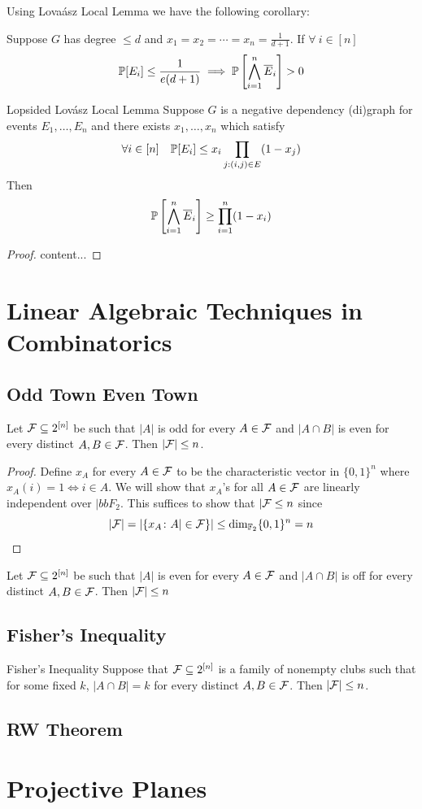 Using Lova\'{a}sz Local Lemma we have the following corollary:
\begin{corolary}{}{}
	Suppose $G$ has degree $\leq d$ and $x_1=x_2=\cdots=x_n=\frac1{d+1}$. If $\forall\ i\in[n]$ $$\mathbb{P}[E_i]\leq\frac{1}{e(d+1)}\implies \mathbb{P}\left[\bigwedge_{i=1}^n\overline{E}_i\right]>0$$
\end{corolary}
\begin{Theorem}{Lopsided Lov\'{a}sz Local Lemma}{}
	Suppose $G$ is a negative dependency (di)graph for events $E_1,\dots, E_n$ and there exists $x_1,\dots, x_n$ which satisfy $$\forall i\in[n]\quad \mathbb{P}[E_i]\leq x_i\prod_{j:(i,j)\in E}(1-x_j)$$Then $$\mathbb{P}\left[\bigwedge_{i=1}^n\overline{E}_i\right]\geq \prod_{i=1}^n(1-x_i)$$
\end{Theorem}
\begin{proof}
	content...
\end{proof}
\section{Linear Algebraic Techniques in Combinatorics}
\subsection{Odd Town Even Town}
\begin{lemma}{}{}
	Let $\mathcal{F}\subseteq 2^{[n]}$ be such that $|A|$ is odd for every $A\in \mathcal{F}$ and $|A\cap B|$ is even for every distinct $A,B\in \mathcal{F}$. Then $|\mathcal{F}|\leq n$.
\end{lemma}
\begin{proof}
	Define $x_A$ for every $A\in \mathcal{F}$ to be the characteristic vector in $\{0,1\}^n$ where $x_A(i)=1\iff i\in A$. We will show that $x_A$'s for all $A\in\mathcal{F}$ are linearly independent over $|bbF_2$. This suffices to show that $|\mathcal{F}\leq n$ since $$|\mathcal{F}|=|\{x_A\colon A|\in\mathcal{F}\}|\leq \dim_{\mathbb{F}_2} \{0,1\}^n=n$$
\end{proof}
\begin{lemma}{}{}
	Let $\mathcal{F}\subseteq 2^{[n]}$ be such that $|A|$ is even for every $A\in \mathcal{F}$ and $|A\cap B|$ is off for every distinct $A,B\in \mathcal{F}$. Then $|\mathcal{F}|\leq n$
\end{lemma}
\subsection{Fisher's Inequality}
\begin{Theorem}{Fisher's Inequality}{}
	Suppose that $\mathcal{F}\subseteq 2^{[n]}$ is a family of nonempty clubs such that for some fixed $k$, $|A\cap B|=k$ for every distinct $A,B\in \mathcal{F}$. Then $|\mathcal{F}|\leq n$.
\end{Theorem}
\subsection{RW Theorem}
\section{Projective Planes}